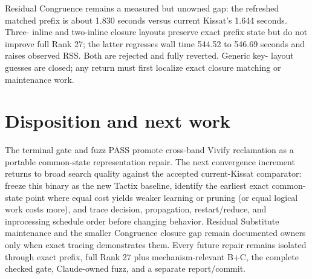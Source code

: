 \documentclass[11pt]{article}
\begin{document}
Residual Congruence remains a measured but unowned gap: the refreshed matched
prefix is about 1.830 seconds versus current Kissat's 1.644 seconds.  Three-
inline and two-inline closure layouts preserve exact prefix state but do not
improve full Rank 27; the latter regresses wall time 544.52 to 546.69 seconds
and raises observed RSS.  Both are rejected and fully reverted.  Generic key-
layout guesses are closed; any return must first localize exact closure
matching or maintenance work.

\section{Disposition and next work}
The terminal gate and fuzz PASS promote cross-band Vivify reclamation as a
portable common-state representation repair.  The next convergence increment
returns to broad search quality against the accepted current-Kissat comparator:
freeze this binary as the new Tactix baseline, identify the earliest exact
common-state point where equal cost yields weaker learning or pruning (or equal
logical work costs more), and trace decision, propagation, restart/reduce, and
inprocessing schedule order before changing behavior.  Residual Substitute
maintenance and the smaller Congruence closure gap remain documented owners
only when exact tracing demonstrates them.  Every future repair remains
isolated through exact prefix, full Rank 27 plus mechanism-relevant B+C, the
complete checked gate, Claude-owned fuzz, and a separate report/commit.
\end{document}
